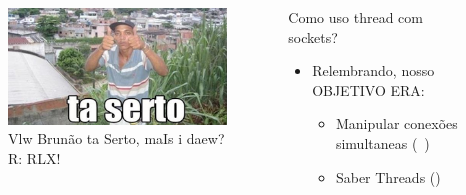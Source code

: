 \documentclass[10pt, xcolor=x11names]{beamer}
\begin{document}
\begin{frame}
	\begin{columns}
			\begin{figure}
				\includegraphics[width=.8\linewidth]{img/taserto.png}
				\caption{Vlw Brunão ta Serto, maIs i daew? R: RLX!}
			\end{figure}
		

		\begin{block}{Como uso thread com sockets?}
			\begin{itemize}
				\item Relembrando, nosso OBJETIVO ERA:
					\begin{itemize}
						\item Manipular conexões simultaneas (~)
						\item Saber Threads (\checkmark)
					\end{itemize}
			\end{itemize}
		\end{block}
		
	\end{columns}
\end{frame}
\end{document}
